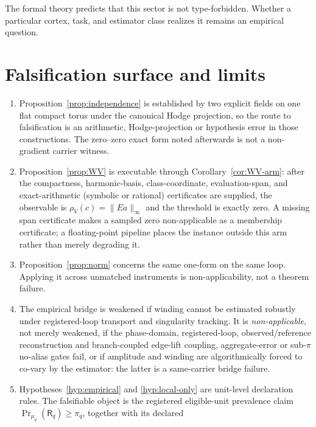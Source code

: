 \documentclass[11pt]{article}
\theoremstyle{definition}
\begin{document}
The formal theory predicts that this sector is not type-forbidden.
Whether a particular cortex, task, and estimator class realizes it remains
an empirical question.

\section{Falsification surface and limits}

\begin{enumerate}[leftmargin=2.2em]
  \item Proposition~\ref{prop:independence} is established by two explicit
        fields on one flat compact torus under the canonical Hodge projection,
        so the route to falsification is an arithmetic, Hodge-projection or
        hypothesis error in those constructions.  The zero--zero exact form
        noted afterwards is not a non-gradient carrier witness.
  \item Proposition~\ref{prop:WV} is executable through
        Corollary~\ref{cor:WV-arm}: after the compactness, harmonic-basis,
        class-coordinate, evaluation-span, and exact-arithmetic
        (symbolic or rational) certificates are supplied,
        the observable is \(\rho_V(c)=\lVert Ea\rVert_\infty\) and the
        threshold is exactly zero.  A missing span certificate makes a
        sampled zero non-applicable as a membership certificate; a
        floating-point pipeline places the instance outside this arm
        rather than merely degrading it.
  \item Proposition~\ref{prop:norm} concerns the same one-form on the
        same loop.  Applying it across unmatched instruments is
        non-applicability, not a theorem failure.
  \item The empirical bridge is weakened if winding cannot be estimated
        robustly under registered-loop transport and singularity tracking.
        It is \emph{non-applicable}, not merely weakened, if the
        phase-domain, registered-loop, observed/reference reconstruction and
        branch-coupled edge-lift coupling,
        aggregate-error or sub-\(\pi\) no-alias gates fail,
        or if amplitude and winding are algorithmically forced to co-vary
        by the estimator: the latter is a same-carrier bridge failure.
  \item Hypotheses~\ref{hyp:empirical} and
        \ref{hyp:local-only} are unit-level declaration rules.  The
        falsifiable object is the registered eligible-unit prevalence claim
        \(\Pr_{\mu_q}(\mathsf R_q)\ge\pi_q\), together with its declared

\end{enumerate}
\end{document}
